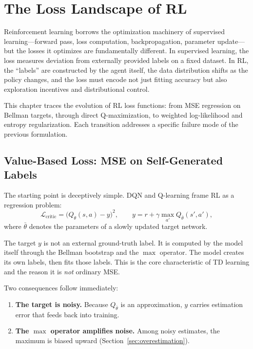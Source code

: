 \chapter{The Loss Landscape of RL}
\label{ch:loss-landscape}

Reinforcement learning borrows the optimization machinery of supervised learning---forward pass, loss computation, backpropagation, parameter update---but the losses it optimizes are fundamentally different. In supervised learning, the loss measures deviation from externally provided labels on a fixed dataset. In RL, the ``labels'' are constructed by the agent itself, the data distribution shifts as the policy changes, and the loss must encode not just fitting accuracy but also exploration incentives and distributional control.

This chapter traces the evolution of RL loss functions: from MSE regression on Bellman targets, through direct Q-maximization, to weighted log-likelihood and entropy regularization. Each transition addresses a specific failure mode of the previous formulation.

\section{Value-Based Loss: MSE on Self-Generated Labels}
\label{sec:td-mse}

The starting point is deceptively simple. DQN and Q-learning frame RL as a regression problem:
\begin{equation}
  \mathcal{L}_{\text{critic}} = \bigl(Q_\theta(s,a) - y\bigr)^2,
  \qquad
  y = r + \gamma \max_{a'} Q_{\bar\theta}(s', a'),
  \label{eq:td-loss}
\end{equation}
where $\bar\theta$ denotes the parameters of a slowly updated target network.

\begin{keyidea}
The target $y$ is not an external ground-truth label. It is computed by the model itself through the Bellman bootstrap and the $\max$ operator. The model creates its own labels, then fits those labels. This is the core characteristic of TD learning and the reason it is \emph{not} ordinary MSE.
\end{keyidea}

Two consequences follow immediately:
\begin{enumerate}
  \item \textbf{The target is noisy.} Because $Q_{\bar\theta}$ is an approximation, $y$ carries estimation error that feeds back into training.
  \item \textbf{The $\max$ operator amplifies noise.} Among noisy estimates, the maximum is biased upward (Section~\ref{sec:overestimation}).
\end{enumerate}


